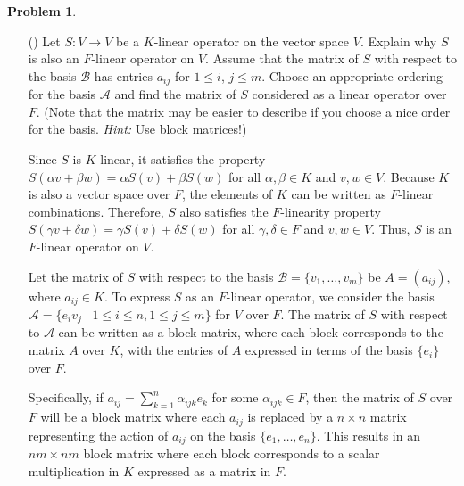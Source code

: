 \documentclass[12pt]{article}
\theoremstyle{definition}
\newtheorem{problem}{Problem}
\newcounter{subq}[problem]
\newenvironment{subproblem}
{\refstepcounter{subq} \begin{itemize} \item[(\alph{subq})]}
{\end{itemize} \medskip}
\begin{document}
\begin{problem}
    \begin{subproblem}
        Let $S: V \longrightarrow V$ be a $K$-linear operator on the vector space $V$. Explain why $S$ is also an $F$-linear operator on $V$.
        Assume that the matrix of $S$ with respect to the basis $\mathcal{B}$ has entries $a_{ij}$ for $1 \leq i$, $j \leq m$. Choose an appropriate 
        ordering for the basis $\mathcal{A}$ and find the matrix of $S$ considered as a linear operator over $F$. (Note that the matrix may be easier
        to describe if you choose a nice order for the basis. \textit{Hint:} Use block matrices!)

        \begin{solution}
            Since $S$ is $K$-linear, it satisfies the property $S(\alpha v + \beta w) = \alpha S(v) + \beta S(w)$ for all $\alpha, \beta \in K$ and $v, w \in V$. Because $K$ is also a vector space over $F$, the elements of $K$ can be written as $F$-linear combinations. Therefore, $S$ also satisfies the $F$-linearity property $S(\gamma v + \delta w) = \gamma S(v) + \delta S(w)$ for all $\gamma, \delta \in F$ and $v, w \in V$. Thus, $S$ is an $F$-linear operator on $V$.

            Let the matrix of $S$ with respect to the basis $\mathcal{B} = \{v_1, \dots, v_m\}$ be $A = (a_{ij})$, where $a_{ij} \in K$. To express $S$ as an $F$-linear operator, we consider the basis $\mathcal{A} = \{e_i v_j \mid 1 \leq i \leq n, 1 \leq j \leq m\}$ for $V$ over $F$. The matrix of $S$ with respect to $\mathcal{A}$ can be written as a block matrix, where each block corresponds to the matrix $A$ over $K$, with the entries of $A$ expressed in terms of the basis $\{e_i\}$ over $F$. 
    
            Specifically, if $a_{ij} = \sum_{k=1}^n \alpha_{ijk} e_k$ for some $\alpha_{ijk} \in F$, then the matrix of $S$ over $F$ will be a block matrix where each $a_{ij}$ is replaced by a $n \times n$ matrix representing the action of $a_{ij}$ on the basis $\{e_1, \dots, e_n\}$. This results in an $nm \times nm$ block matrix where each block corresponds to a scalar multiplication in $K$ expressed as a matrix in $F$.    
        \end{solution}
    \end{subproblem}
\end{problem}
\end{document}
